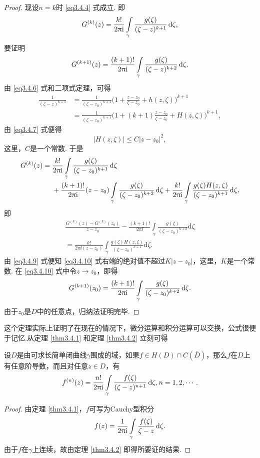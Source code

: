 \begin{proof}
  现设$n=k$时 \eqref{eq3.4.4} 式成立. 即
  \[
    G^{(k)}(z) = \frac{k!}{2\uppi\mathrm i}\int\limits_\gamma\frac{g(\zeta)}{(\zeta-z)^{k+1}}\mathop{}\!\mathrm{d} \zeta,
  \]
  要证明
  \[
    G^{(k+1)}(z) = \frac{(k+1)!}{2\uppi\mathrm i}\int\limits_\gamma\frac{g(\zeta)}{(\zeta-z)^{k+2}}\mathop{}\!\mathrm{d} \zeta.
  \]
  由 \eqref{eq3.4.6} 式和二项式定理，可得
  \begin{align*}
    \frac{1}{( \zeta -z) ^{k+1}} & = \frac{1}{( \zeta -z_0 ) ^{k+1}}\bigg( 1+\frac{z-z_0}{\zeta -z_0}+h( z,\zeta ) \bigg) ^{k+1}\\
    & = \frac{1}{( \zeta -z_0 ) ^{k+1}}\bigg( 1+(k+1)\frac{z-z_0}{\zeta -z_0}+H( z,\zeta ) \bigg) ^{k+1},
  \end{align*}
  由 \eqref{eq3.4.7} 式便得
  \begin{equation}\label{eq3.4.9}
    |H(z,\zeta)|\le C|z-z_0|^2,
  \end{equation}
  这里，$C$是一个常数. 于是
  \begin{align*}
    G^{(k)}(z) = {}& \frac{k!}{2\uppi\mathrm i}\int\limits_\gamma\frac{g(\zeta)}{(\zeta-z_0)^{k+1}}\mathop{}\!\mathrm{d} \zeta\\
    & +\frac{(k+1)!}{2\uppi\mathrm i}(z-z_0)\int\limits_\gamma\frac{g(\zeta)}{(\zeta-z_0)^{k+2}}
    \mathop{}\!\mathrm{d} \zeta+\frac{k!}{2\uppi\mathrm i}\int\limits_\gamma\frac{g(\zeta)H(z,\zeta)}{(\zeta-z_0)^{k+1}}
    \mathop{}\!\mathrm{d} \zeta,
  \end{align*}
  即
  \begin{equation}\label{eq3.4.10}
    \begin{gathered}
      \frac{G^{( k )}( z ) -G^{( k )}( z_0 )}{z-z_0}-\frac{( k+1 ) !}{2\pi\ii}\int\limits_{\gamma}{\frac{g( \zeta )}{( \zeta -z_0 ) ^{k+2}}\text{d}\zeta}\\
      = \frac{k!}{2\pi\ii ( z-z_0 )}\int\limits_{\gamma}{\frac{g( \zeta ) H( z,\zeta )}{( \zeta -z_0 ) ^{k+1}}\text{d}\zeta}.
    \end{gathered}
  \end{equation}
  由 \eqref{eq3.4.9} 式便知 \eqref{eq3.4.10} 式右端的绝对值不超过$K|z-z_0|$，这里，$K$是一个常数. 在 \eqref{eq3.4.10} 式中令$z\to z_0$，即得
  \[
    G^{(k+1)}(z_0) = \frac{(k+1)!}{2\uppi\mathrm i}\int\limits_\gamma\frac{g(\zeta)}{(\zeta-z_0)^{k+2}}\mathop{}\!\mathrm{d} \zeta.
  \]
  由于$z_0$是$D$中的任意点，归纳法证明完毕.
\end{proof}

这个定理实际上证明了在现在的情况下，微分运算和积分运算可以交换，公式很便于记忆.从定理 \ref{thm3.4.1} 和定理 \ref{thm3.4.2} 立刻可得
\begin{theorem}\label{thm3.4.3}
  设$D$是由可求长简单闭曲线$\gamma$围成的域，如果$f\in H(D)\cap C(\bar D)$，那么$f$在$D$上有任意阶导数，而且对任意$z\in D$，有
  \begin{equation*}
    f^{(n)}(z) = \frac{n!}{2\uppi\mathrm i}\int\limits_\gamma\frac{f(\zeta)}{(\zeta-z)^{n+1}}\mathop{}\!\mathrm{d} \zeta,n=1,2,\cdots.
  \end{equation*}
\end{theorem}
\begin{proof}
  由定理 \ref{thm3.4.1}，$f$可写为Cauchy型积分
  \[
    f(z) = \frac1{2\uppi\mathrm i}\int\limits_{\gamma}\frac{f(\zeta)}{\zeta-z}\mathop{}\!\mathrm{d} \zeta.
  \]
  由于$f$在$\gamma$上连续，故由定理 \ref{thm3.4.2} 即得所要证的结果.
\end{proof}

